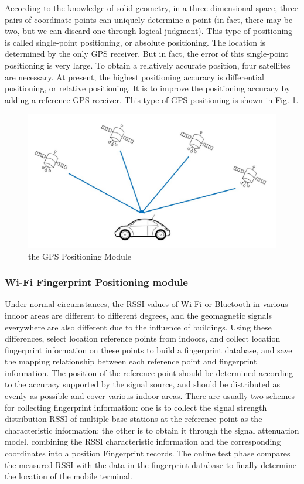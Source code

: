 \documentclass[conference]{IEEEtran}
\begin{document}
According to the knowledge of solid geometry, in a three-dimensional space, three pairs of coordinate points can uniquely determine a point (in fact, there may be two, but we can discard one through logical judgment). This type of positioning is called single-point positioning, or absolute positioning. The location is determined by the only GPS receiver. But in fact, the error of this single-point positioning is very large. To obtain a relatively accurate position, four satellites are necessary. At present, the highest positioning accuracy is differential positioning, or relative positioning. It is to improve the positioning accuracy by adding a reference GPS receiver. This type of GPS positioning is shown in Fig. \ref{fig:gps}.

\begin{figure}[h]
	\centering
	\includegraphics[scale=0.4]{./figures/gps.jpg}
	\caption{the GPS Positioning Module}
	\label{fig:gps}
\end{figure}


\subsubsection{Wi-Fi Fingerprint Positioning module}
Under normal circumstances, the RSSI values of Wi-Fi or Bluetooth in various indoor areas are different to different degrees, and the geomagnetic signals everywhere are also different due to the influence of buildings. Using these differences, select location reference points from indoors, and collect location fingerprint information on these points to build a fingerprint database, and save the mapping relationship between each reference point and fingerprint information. The position of the reference point should be determined according to the accuracy supported by the signal source, and should be distributed as evenly as possible and cover various indoor areas. There are usually two schemes for collecting fingerprint information: one is to collect the signal strength distribution RSSI of multiple base stations at the reference point as the characteristic information; the other is to obtain it through the signal attenuation model, combining the RSSI characteristic information and the corresponding coordinates into a position Fingerprint records. The online test phase compares the measured RSSI with the data in the fingerprint database to finally determine the location of the mobile terminal.
\end{document}
